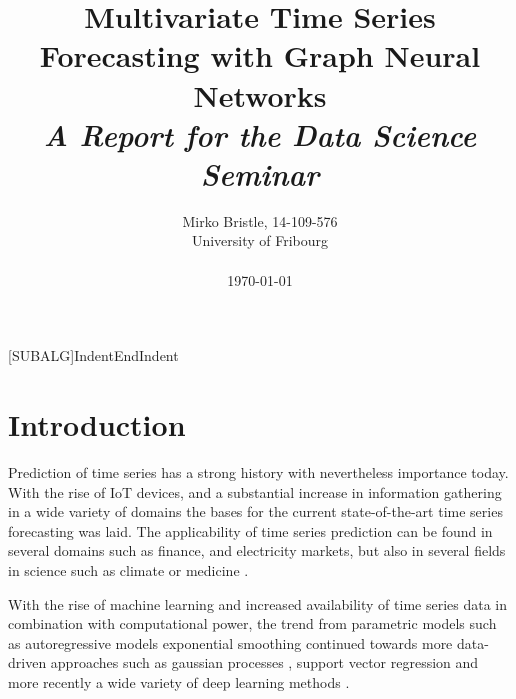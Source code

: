 \documentclass[letterpaper,twocolumn,11pt]{article}
\begin{document}
    [SUBALG]{Indent}{EndIndent}{}{\algorithmicend\ }%

    \title{\Large \bf Multivariate Time Series Forecasting with Graph Neural Networks \\
    \Medium \it A Report for the Data Science Seminar
    }

    \author{
            {\rm Mirko Bristle, 14-109-576}\\
        University of Fribourg \\
        \\
        \today
    }
    \maketitle


%


    \section{Introduction}

    Prediction of time series has a strong history with nevertheless importance today. With the rise of IoT devices, and a substantial
    increase in information gathering in a wide variety of domains the bases for the current state-of-the-art time series forecasting was laid.
    The applicability of time series prediction can be found in several domains such as finance, and electricity markets, but also in several fields in science such as climate \cite{mudelsee2019trend} or medicine \cite{topol2019high}.

	With the rise of machine learning and increased availability of time series data in combination with computational power, the trend from parametric models such as autoregressive models \cite{box2015time} exponential smoothing \cite{gardner1985exponential} continued towards more data-driven approaches such as gaussian processes \cite{williams1995gaussian}, support vector regression \cite{smola2004tutorial} and more recently a wide variety of deep learning methods \cite{lim2021time, torres2021deep}.
\end{document}
